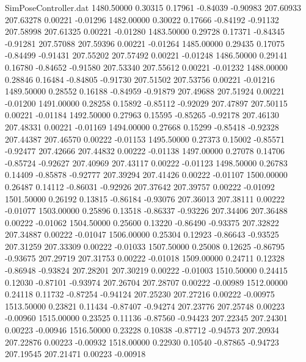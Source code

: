 \begin{filecontents}{SimPoseController.dat}
1480.50000    0.30315    0.17961    -0.84039   -0.90983  207.60933  207.63278    0.00221   -0.01296
1482.00000    0.30022    0.17666    -0.84192   -0.91132  207.58998  207.61325    0.00221   -0.01280
1483.50000    0.29728    0.17371    -0.84345   -0.91281  207.57088  207.59396    0.00221   -0.01264
1485.00000    0.29435    0.17075    -0.84499   -0.91431  207.55202  207.57492    0.00221   -0.01248
1486.50000    0.29141    0.16780    -0.84652   -0.91580  207.53340  207.55612    0.00221   -0.01232
1488.00000    0.28846    0.16484    -0.84805   -0.91730  207.51502  207.53756    0.00221   -0.01216
1489.50000    0.28552    0.16188    -0.84959   -0.91879  207.49688  207.51924    0.00221   -0.01200
1491.00000    0.28258    0.15892    -0.85112   -0.92029  207.47897  207.50115    0.00221   -0.01184
1492.50000    0.27963    0.15595    -0.85265   -0.92178  207.46130  207.48331    0.00221   -0.01169
1494.00000    0.27668    0.15299    -0.85418   -0.92328  207.44387  207.46570    0.00222   -0.01153
1495.50000    0.27373    0.15002    -0.85571   -0.92477  207.42666  207.44832    0.00222   -0.01138
1497.00000    0.27078    0.14706    -0.85724   -0.92627  207.40969  207.43117    0.00222   -0.01123
1498.50000    0.26783    0.14409    -0.85878   -0.92777  207.39294  207.41426    0.00222   -0.01107
1500.00000    0.26487    0.14112    -0.86031   -0.92926  207.37642  207.39757    0.00222   -0.01092
1501.50000    0.26192    0.13815    -0.86184   -0.93076  207.36013  207.38111    0.00222   -0.01077
1503.00000    0.25896    0.13518    -0.86337   -0.93226  207.34406  207.36488    0.00222   -0.01062
1504.50000    0.25600    0.13220    -0.86490   -0.93375  207.32822  207.34887    0.00222   -0.01047
1506.00000    0.25304    0.12923    -0.86643   -0.93525  207.31259  207.33309    0.00222   -0.01033
1507.50000    0.25008    0.12625    -0.86795   -0.93675  207.29719  207.31753    0.00222   -0.01018
1509.00000    0.24711    0.12328    -0.86948   -0.93824  207.28201  207.30219    0.00222   -0.01003
1510.50000    0.24415    0.12030    -0.87101   -0.93974  207.26704  207.28707    0.00222   -0.00989
1512.00000    0.24118    0.11732    -0.87254   -0.94124  207.25230  207.27216    0.00222   -0.00975
1513.50000    0.23821    0.11434    -0.87407   -0.94274  207.23776  207.25748    0.00223   -0.00960
1515.00000    0.23525    0.11136    -0.87560   -0.94423  207.22345  207.24301    0.00223   -0.00946
1516.50000    0.23228    0.10838    -0.87712   -0.94573  207.20934  207.22876    0.00223   -0.00932
1518.00000    0.22930    0.10540    -0.87865   -0.94723  207.19545  207.21471    0.00223   -0.00918

\end{filecontents}
